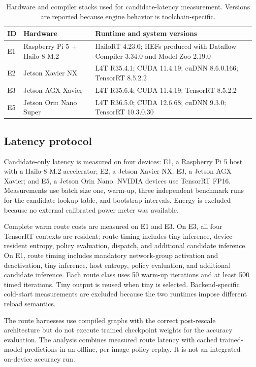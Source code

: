 \documentclass[a4paper,review,12pt]{elsarticle}
\begin{document}
\begin{table}[t]
\centering
\caption{Hardware and compiler stacks used for candidate-latency measurement. Versions are reported because engine behavior is toolchain-specific.}
\label{tab:hardware}
\small
\begin{tabularx}{\textwidth}{@{}llX@{}}
\toprule
ID & Hardware & Runtime and system versions \\
\midrule
E1 & Raspberry Pi 5 + Hailo-8 M.2 & HailoRT 4.23.0; HEFs produced with Dataflow Compiler 3.34.0 and Model Zoo 2.19.0 \\
E2 & Jetson Xavier NX & L4T R35.4.1; CUDA 11.4.19; cuDNN 8.6.0.166; TensorRT 8.5.2.2 \\
E3 & Jetson AGX Xavier & L4T R35.6.4; CUDA 11.4.19; TensorRT 8.5.2.2 \\
E5 & Jetson Orin Nano Super & L4T R36.5.0; CUDA 12.6.68; cuDNN 9.3.0; TensorRT 10.3.0.30 \\
\bottomrule
\end{tabularx}
\end{table}

\subsection{Latency protocol}

Candidate-only latency is measured on four devices: E1, a Raspberry Pi 5 host with a Hailo-8 M.2 accelerator; E2, a Jetson Xavier NX; E3, a Jetson AGX Xavier; and E5, a Jetson Orin Nano. NVIDIA devices use TensorRT FP16. Measurements use batch size one, warm-up, three independent benchmark runs for the candidate lookup table, and bootstrap intervals. Energy is excluded because no external calibrated power meter was available.

Complete warm route costs are measured on E1 and E3. On E3, all four TensorRT contexts are resident; route timing includes tiny inference, device-resident entropy, policy evaluation, dispatch, and additional candidate inference. On E1, route timing includes mandatory network-group activation and deactivation, tiny inference, host entropy, policy evaluation, and additional candidate inference. Each route class uses 50 warm-up iterations and at least 500 timed iterations. Tiny output is reused when tiny is selected. Backend-specific cold-start measurements are excluded because the two runtimes impose different reload semantics.

The route harnesses use compiled graphs with the correct post-rescale architecture but do not execute trained checkpoint weights for the accuracy evaluation. The analysis combines measured route latency with cached trained-model predictions in an offline, per-image policy replay. It is not an integrated on-device accuracy run.
\end{document}
